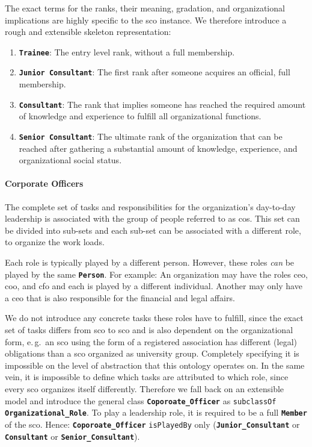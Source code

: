 \documentclass[a4paper, DIV=13, BCOR=0cm]{scrbook}
\newcommand{\eg}{e.\,g.\ }
\newcommand{\class}[1]{\texttt{\textbf{#1}}}
\newcommand{\relation}[1]{\texttt{#1}}
\begin{document}
The exact terms for the ranks, their meaning, gradation, and organizational implications are highly specific to the \gls{sco} instance. We therefore introduce a rough and extensible skeleton representation:
\begin{enumerate}
	\item \class{Trainee}: The entry level rank, without a full membership.
	\item \class{Junior Consultant}: The first rank after someone acquires an official, full membership.
	\item \class{Consultant}: The rank that implies someone has reached the required amount of knowledge and experience to fulfill all organizational functions.
	\item \class{Senior Consultant}: The ultimate rank of the organization that can be reached after gathering a substantial amount of knowledge, experience, and organizational social status.
\end{enumerate}

\paragraph{Corporate Officers}
The complete set of tasks and responsibilities for the organization's day-to-day leadership is associated with the group of people referred to as \glspl{co}. This set can be divided into sub-sets and each sub-set can be associated with a different role, to organize the work loads.

Each role is typically played by a different person. However, these roles \textit{can} be played by the same \class{Person}. For example: An organization may have the roles \gls{ceo}, \gls{coo}, and \gls{cfo} and each is played by a different individual. Another may only have a \gls{ceo} that is also responsible for the financial and legal affairs.

We do not introduce any concrete tasks these roles have to fulfill, since the exact set of tasks differs from \gls{sco} to \gls{sco} and is also dependent on the organizational form, \eg an \gls{sco} using the form of a registered association has different (legal) obligations than a \gls{sco} organized as university group. Completely specifying it is  impossible on the level of abstraction that this ontology operates on. In the same vein, it is impossible to define which tasks are attributed to which role, since every \gls{sco} organizes itself differently. Therefore we fall back on an extensible model and introduce the general class \class{Coporoate\_Officer} as \relation{subclassOf} \class{Organizational\_Role}. To play a leadership role, it is required to be a full \class{Member} of the \gls{sco}. Hence: \class{Coporoate\_Officer} \relation{isPlayedBy} only (\class{Junior\_Consultant} or \class{Consultant} or \class{Senior\_Consultant}).
\end{document}

